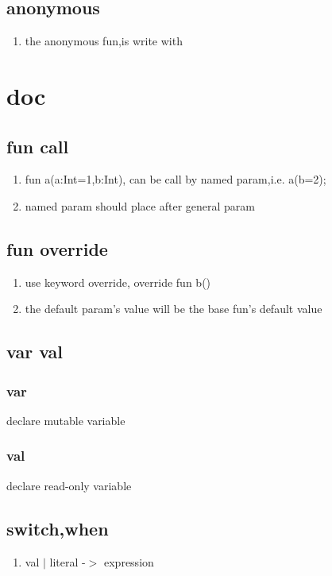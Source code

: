 \documentclass{article}
\begin{document}
            \subsection{anonymous}
                \begin{enumerate}
                    \item the anonymous fun,is write with {}
                \end{enumerate}
\newpage
\section{doc}
    \subsection{fun call}
         \begin{enumerate}
            \item fun a(a:Int=1,b:Int){}, can be call by named param,i.e. a(b=2);
            \item named param should place after general param
         \end{enumerate}
    \subsection{fun override}
         \begin{enumerate}
             \item use keyword override, override fun b(){}
             \item the default param's value will be the base fun's default value
         \end{enumerate}
    \subsection{var val}
         \subsubsection{var}
            declare mutable variable
         \subsubsection{val}
            declare read-only variable
    \subsection{switch,when}
         \begin{enumerate}
             \item val $|$ literal -$>$ expression
         \end{enumerate}
\end{document}
